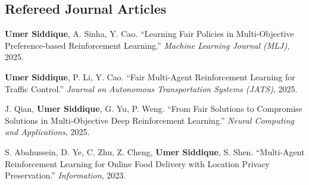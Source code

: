 \documentclass[letterpaper,11pt]{article}
\begin{document}
\subsection*{Refereed Journal Articles}
\begin{publist}[label={[J\arabic*]}]
    \item \textbf{Umer Siddique}, A. Sinha, Y. Cao. ``Learning Fair Policies in Multi-Objective Preference-based Reinforcement Learning.'' \textit{Machine Learning Journal (MLJ)}, 2025.
    \item \textbf{Umer Siddique}, P. Li, Y. Cao. ``Fair Multi-Agent Reinforcement Learning for Traffic Control.'' \textit{Journal on Autonomous Transportation Systems (JATS)}, 2025.
    \item J. Qian, \textbf{Umer Siddique}, G. Yu, P. Weng. ``From Fair Solutions to Compromise Solutions in Multi-Objective Deep Reinforcement Learning.'' \textit{Neural Computing and Applications}, 2025.
    \item S. Abahussein, D. Ye, C. Zhu, Z. Cheng, \textbf{Umer Siddique}, S. Shen. ``Multi-Agent Reinforcement Learning for Online Food Delivery with Location Privacy Preservation.'' \textit{Information}, 2023.
\end{publist}
\end{document}
